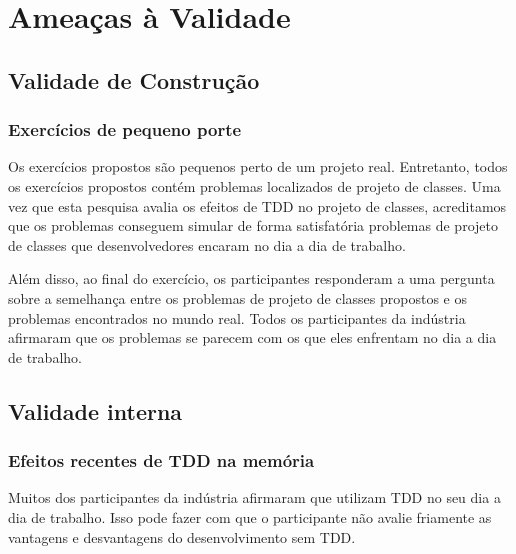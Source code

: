 \documentclass[conference]{IEEEtran}
\begin{document}
\section{Ameaças à Validade}
\label{cap:ameacas}

\subsection{Validade de Construção}

\subsubsection{Exercícios de pequeno porte}

Os exercícios propostos são pequenos perto de um projeto real. Entretanto, todos os exercícios propostos contém
problemas localizados de projeto de classes. Uma vez que esta pesquisa avalia os 
efeitos de TDD no projeto de classes, 
acreditamos que os problemas conseguem simular de forma satisfatória
problemas de projeto de classes que desenvolvedores encaram no dia a dia de trabalho.

Além disso, ao final do exercício, os participantes responderam a uma pergunta sobre a semelhança
entre os problemas de projeto de classes propostos e os problemas encontrados no mundo real.
Todos os participantes da indústria afirmaram que os problemas se parecem com os que eles enfrentam
no dia a dia de trabalho. 

\subsection{Validade interna}

\subsubsection{Efeitos recentes de TDD na memória}

Muitos dos participantes da indústria afirmaram que utilizam TDD no seu dia a dia de trabalho.
Isso pode fazer com que o participante
não avalie friamente as vantagens e desvantagens do desenvolvimento sem TDD. 
\end{document}
